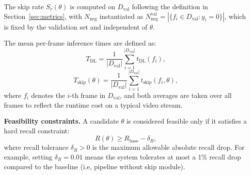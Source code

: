 The skip rate $S_r(\theta)$ is computed on $D_{\text{val}}$ following the
definition in Section~\ref{sec:metrics}, with $N_{\text{neg}}$ instantiated as
$N_{\text{neg}}^{\text{val}} = |\{f_i \in D_{\text{val}} : y_i = 0\}|$, which
is fixed by the validation set and independent of $\theta$.

The mean per-frame inference times are defined as:
\begin{equation}
    T_{\text{DL}} = \frac{1}{|D_{\text{val}}|}
    \sum_{i=1}^{|D_{\text{val}}|} t_{\text{DL}}(f_i),
\end{equation}
\begin{equation}
    T_{\text{skip}}(\theta) = \frac{1}{|D_{\text{val}}|}
    \sum_{i=1}^{|D_{\text{val}}|} t_{\text{skip}}(f_i, \theta),
\end{equation}
where $f_i$ denotes the $i$-th frame in $D_{\text{val}}$, and both averages are
taken over all frames to reflect the runtime cost on a typical video stream.



\textbf{Feasibility constraints.} A candidate $\theta$ is considered feasible
only if it satisfies a hard recall constraint:
\begin{equation}
    R(\theta) \geq R_{\text{base}} - \delta_R,
\end{equation}
where recall tolerance $\delta_R > 0$ is the maximum allowable absolute recall
drop. For example, setting $\delta_R = 0.01$ means the system tolerates at most
a 1\% recall drop compared to the baseline (i.e, pipeline without skip module). 

